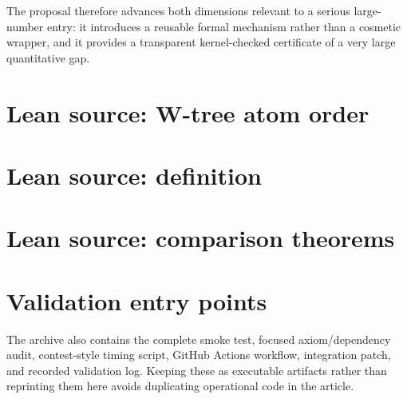 \documentclass[11pt]{article}
\theoremstyle{definition}
\theoremstyle{remark}
\begin{document}
The proposal therefore advances both dimensions relevant to a serious
large-number entry: it introduces a reusable formal mechanism rather than a
cosmetic wrapper, and it provides a transparent kernel-checked certificate of
a very large quantitative gap.

\appendix

\section{Lean source: W-tree atom order}
\label{app:wtree}


\section{Lean source: definition}
\label{app:def}


\section{Lean source: comparison theorems}
\label{app:comparison}


\section{Validation entry points}
\label{app:validation}
The archive also contains the complete smoke test, focused axiom/dependency
audit, contest-style timing script, GitHub Actions workflow, integration patch,
and recorded validation log.  Keeping these as executable artifacts rather
than reprinting them here avoids duplicating operational code in the article.
\end{document}
